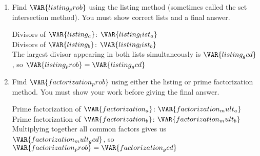 
\begin{enumerate}

    \item Find $\VAR{listing_prob}$ using the listing method (sometimes called the set intersection method). You must show correct lists and a final answer.

    \vfill

    \begin{ansenv}
        Divisors of $\VAR{listing_a}$: $\VAR{listing_list_a}$\\

        Divisors of $\VAR{listing_b}$: $\VAR{listing_list_b}$\\

        The largest divisor appearing in both lists simultaneously is $\VAR{listing_gcd}$, so $\VAR{listing_prob} = \VAR{listing_gcd}$
    \end{ansenv}

    \vfill

    \item Find $\VAR{factorization_prob}$ using either the listing or prime factorization method. You must show your work before giving the final answer.

    \vfill

    \begin{ansenv}
        Prime factorization of $\VAR{factorization_a}$: $\VAR{factorization_mult_a}$\\

        Prime factorization of $\VAR{factorization_b}$: $\VAR{factorization_mult_b}$\\

        Multiplying together all common factors gives us $\VAR{factorization_mult_gcd}$, so $\VAR{factorization_prob} = \VAR{factorization_gcd}$
    \end{ansenv}

    \vfill

\end{enumerate}

\trueemptypage